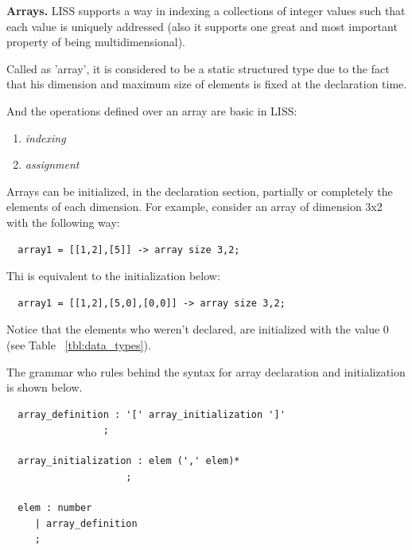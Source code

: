 \documentclass[
  oneside,
  11pt, a4paper,
  footinclude=true,
  headinclude=true,
  cleardoublepage=empty
]{scrbook}
\begin{document}
\bigbreak

\textbf{Arrays.}
LISS supports a way in indexing a collections of integer values such that each value is uniquely addressed (also it supports one great and most important property of being multidimensional).

Called as 'array', it is considered to be a static structured type due to the fact that his dimension and maximum size of elements is fixed at the declaration time.


And the operations defined over an array are basic in LISS:

\begin{enumerate}
\item \textit{indexing} %
\item \textit{assignment} %
\end{enumerate}


Arrays can be initialized, in the declaration section, partially or completely the elements of each dimension.
For example, consider an array of dimension 3x2 with the following way:

\begin{lstlisting}
  array1 = [[1,2],[5]] -> array size 3,2;
\end{lstlisting} 

Thi is equivalent to the initialization below:

\begin{lstlisting}
  array1 = [[1,2],[5,0],[0,0]] -> array size 3,2;
\end{lstlisting}

Notice that the elements who weren't declared, are initialized with the value 0 (see Table ~\ref{tbl:data_types}).

The grammar who rules behind the syntax for array declaration and initialization is shown below.

\begin{lstlisting}
  array_definition : '[' array_initialization ']'
                 ;

  array_initialization : elem (',' elem)*
                     ;

  elem : number
     | array_definition
     ;
\end{lstlisting}
\end{document}
